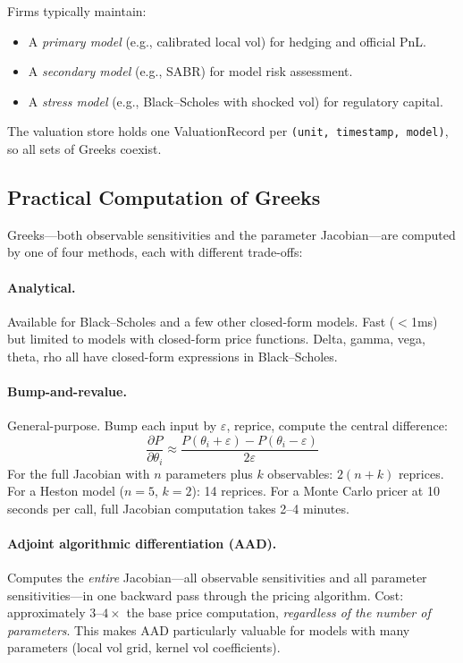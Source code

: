 \documentclass[11pt,a4paper]{article}
\begin{document}
\noindent Firms typically maintain:
\begin{itemize}[nosep]
\item A \emph{primary model} (e.g., calibrated local vol) for hedging and official PnL.
\item A \emph{secondary model} (e.g., SABR) for model risk assessment.
\item A \emph{stress model} (e.g., Black--Scholes with shocked vol) for regulatory capital.
\end{itemize}

\noindent The valuation store holds one ValuationRecord per \texttt{(unit, timestamp, model)}, so all sets of Greeks coexist.

\subsection{Practical Computation of Greeks}
\label{sec:greek-computation}

Greeks---both observable sensitivities and the parameter Jacobian---are computed by one of four methods, each with different trade-offs:

\paragraph{Analytical.}  Available for Black--Scholes and a few other closed-form models.  Fast ($<$1ms) but limited to models with closed-form price functions.  Delta, gamma, vega, theta, rho all have closed-form expressions in Black--Scholes.

\paragraph{Bump-and-revalue.}  General-purpose.  Bump each input by $\varepsilon$, reprice, compute the central difference:
\[
\frac{\partial P}{\partial \theta_i} \approx \frac{P(\theta_i + \varepsilon) - P(\theta_i - \varepsilon)}{2\varepsilon}
\]
For the full Jacobian with $n$ parameters plus $k$ observables: $2(n+k)$ reprices.  For a Heston model ($n=5$, $k=2$): 14 reprices.  For a Monte Carlo pricer at 10 seconds per call, full Jacobian computation takes 2--4 minutes.

\paragraph{Adjoint algorithmic differentiation (AAD).}  Computes the \emph{entire} Jacobian---all observable sensitivities and all parameter sensitivities---in one backward pass through the pricing algorithm.  Cost: approximately $3$--$4\times$ the base price computation, \emph{regardless of the number of parameters}.  This makes AAD particularly valuable for models with many parameters (local vol grid, kernel vol coefficients).
\end{document}
